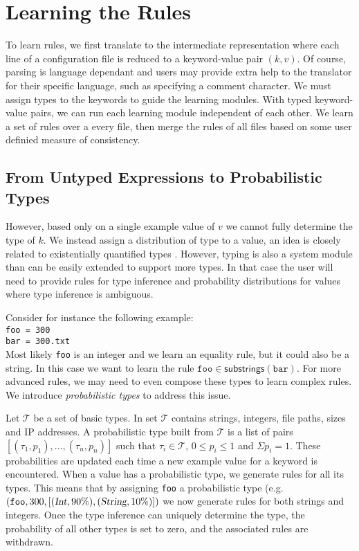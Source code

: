 \section{Learning the Rules}
\label{sec:system}

To learn rules, we first translate to the intermediate representation where each line of a configuration file is reduced to a keyword-value pair $(k,v)$.
Of course, parsing is language dependant and users may provide extra help to the translator for their specific language, such as specifying a comment character.
We must assign types to the keywords to guide the learning modules.
With typed keyword-value pairs, we can run each learning module independent of each other.
We learn a set of rules over a every file, then merge the rules of all files based on some user definied measure of consistency.

\subsection{From Untyped Expressions to Probabilistic Types}

However, based only on a single example value of $v$ we cannot fully determine the type of $k$.
We instead assign a distribution of type to a value, an idea is closely related to existentially quantified types \cite{Launchbury93lazyfunctional}.
However, typing is also a system module than can be easily extended to support more types. 
In that case the user will need to provide rules for type inference and probability distributions for values where type inference is ambiguous.

Consider for instance the following example:\\
\texttt{\hspace*{2em}foo = 300\\
\hspace*{2em}bar = 300.txt}\\
Most likely \texttt{foo} is an integer and we learn an equality rule, but it could also be a string.
In this case we want to learn the rule $ \texttt{foo} \in \textsf{substrings}(\texttt{bar})$. 
For more advanced rules, we may need to even compose these types to learn complex rules.
We introduce {\emph{probabilistic types}} to address this issue.

Let $\mathcal{T}$ be a set of basic types. In \app set $\mathcal{T}$ contains strings, integers, file paths, sizes and IP addresses. 
A probabilistic type built from $\mathcal{T}$ is a list of pairs $[(\tau_1, p_1),\ldots,(\tau_n, p_n)]$ such that $\tau_i \in \mathcal{T}$, 
$0 \le p_i \le 1$ 
and $\Sigma p_i = 1$. These probabilities are updated each time a new example value for a keyword is encountered.
When a value has a probabilistic type, we generate rules for all its types. This means that by assigning {\texttt{foo}} a probabilistic type 
(e.g. $(\texttt{foo}, 300, [(\textsl{Int},90\%),(\textsl{String},10\%)])$
we now generate rules for both strings and integers.
Once the type inference can uniquely determine the type, the probability of all other types is set to zero, and the associated rules are withdrawn.


